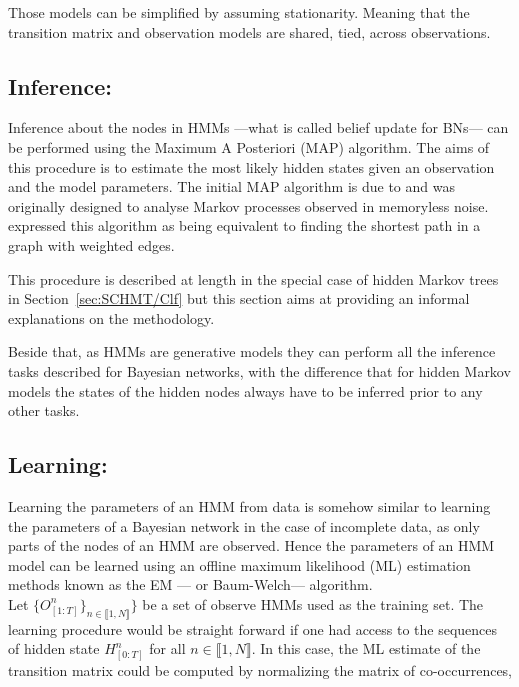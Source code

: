 \documentclass[a4paper,11pt]{report}
\begin{document}
      Those models can be simplified by assuming stationarity. Meaning that the transition matrix and observation models are shared, \ie tied, across observations. 
      
    \subsection{Inference:}
      \label{subsec:PGMs/MM/Inference}
      
      Inference about the nodes in HMMs ---what is called belief update for BNs--- can be performed using the Maximum A Posteriori (MAP) algorithm. The aims of this procedure is to estimate the most likely hidden states given an observation and the model parameters. The initial MAP  algorithm is due to\citet{viterbi1967error} and was originally designed to analyse Markov processes observed in memoryless noise. \citet{forney1973viterbi} expressed this algorithm as being equivalent to finding the shortest path in a graph with weighted edges.\\
      
      \begin{note}
        This procedure is described at length in the special case of hidden Markov trees in Section~\ref{sec:SCHMT/Clf} but this section aims at providing an informal explanations on the methodology.\\
      \end{note}
      
      Beside that, as HMMs are generative models they can perform all the inference tasks described for Bayesian networks, with the difference that for hidden Markov models the states of the hidden nodes always have to be inferred prior to any other tasks.
      
    \subsection{Learning:}
      \label{subsec:PGMs/MM/Learning}
      
      Learning the parameters of an HMM from data is somehow similar to learning the parameters of a Bayesian network in the case of incomplete data, as only parts of the nodes of an HMM are observed. Hence the parameters of an HMM model can be learned using an offline maximum likelihood (ML) estimation methods known as the EM --- or Baum-Welch--- algorithm.\\
      
      Let $\{O_{[1:T]}^{n}\}_{n \in \llbracket 1,N \rrbracket} \}$ be a set of observe HMMs used as the training set. The learning procedure would be straight forward if one had access to the sequences of hidden state $H_{[0:T]}^{n}$ for all $n \in \llbracket 1,N \rrbracket$. In this case, the ML estimate of the transition matrix could be computed by normalizing the matrix of co-occurrences,
      
\end{document}

